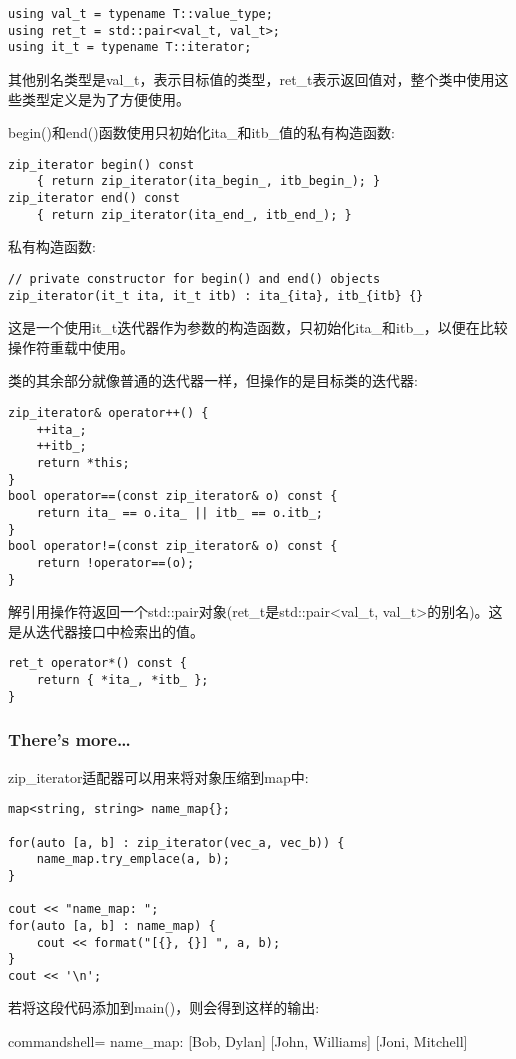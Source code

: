 \begin{lstlisting}[style=styleCXX]
using val_t = typename T::value_type;
using ret_t = std::pair<val_t, val_t>;
using it_t = typename T::iterator;
\end{lstlisting}

其他别名类型是val\_t，表示目标值的类型，ret\_t表示返回值对，整个类中使用这些类型定义是为了方便使用。

begin()和end()函数使用只初始化ita\_和itb\_值的私有构造函数:

\begin{lstlisting}[style=styleCXX]
zip_iterator begin() const
	{ return zip_iterator(ita_begin_, itb_begin_); }
zip_iterator end() const
	{ return zip_iterator(ita_end_, itb_end_); }
\end{lstlisting}

私有构造函数:

\begin{lstlisting}[style=styleCXX]
// private constructor for begin() and end() objects
zip_iterator(it_t ita, it_t itb) : ita_{ita}, itb_{itb} {}
\end{lstlisting}

这是一个使用it\_t迭代器作为参数的构造函数，只初始化ita\_和itb\_，以便在比较操作符重载中使用。

类的其余部分就像普通的迭代器一样，但操作的是目标类的迭代器:

\begin{lstlisting}[style=styleCXX]
zip_iterator& operator++() {
	++ita_;
	++itb_;
	return *this;
}
bool operator==(const zip_iterator& o) const {
	return ita_ == o.ita_ || itb_ == o.itb_;
}
bool operator!=(const zip_iterator& o) const {
	return !operator==(o);
}
\end{lstlisting}

解引用操作符返回一个std::pair对象(ret\_t是std::pair<val\_t, val\_t>的别名)。这是从迭代器接口中检索出的值。

\begin{lstlisting}[style=styleCXX]
ret_t operator*() const {
	return { *ita_, *itb_ };
}
\end{lstlisting}

\subsubsection{There's more…}

zip\_iterator适配器可以用来将对象压缩到map中:

\begin{lstlisting}[style=styleCXX]
map<string, string> name_map{};

for(auto [a, b] : zip_iterator(vec_a, vec_b)) {
	name_map.try_emplace(a, b);
}

cout << "name_map: ";
for(auto [a, b] : name_map) {
	cout << format("[{}, {}] ", a, b);
}
cout << '\n';
\end{lstlisting}

若将这段代码添加到main()，则会得到这样的输出:

\begin{tcblisting}{commandshell={}}
name_map: [Bob, Dylan] [John, Williams] [Joni, Mitchell]
\end{tcblisting}












